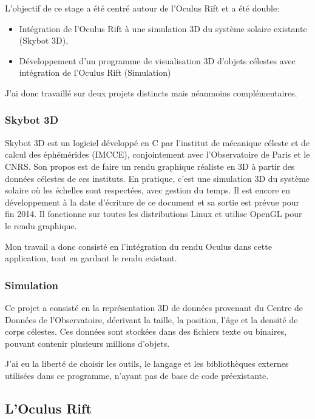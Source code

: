 \documentclass[a4paper,french,12pt]{article}
\begin{document}
		L’objectif de ce stage a été centré autour de l'Oculus Rift et a été double:
		\begin{itemize}
		 \item Intégration de l'Oculus Rift à une simulation 3D du système solaire existante (Skybot 3D),
		 \item Développement d'un programme de visualisation 3D  d'objets célestes avec intégration de l'Oculus Rift (Simulation)
		\end{itemize}
		
		J'ai donc travaillé sur deux projets distincts mais néanmoins complémentaires.
		
	    \subsubsection{Skybot 3D}
		Skybot 3D est un logiciel développé en C par l'institut de mécanique céleste et de calcul des éphémérides (IMCCE),
		conjointement avec l'Observatoire de Paris et le CNRS. Son propos est de faire un rendu graphique réaliste
		en 3D à partir des données célestes de ces instituts. En pratique, c'est une simulation 3D du système solaire
		où les échelles sont respectées, avec gestion du temps. Il est encore en développement à la date d'écriture de ce document et
		sa sortie est prévue pour fin 2014.
		Il fonctionne sur toutes les distributions Linux et utilise OpenGL pour le rendu graphique.
		
		Mon travail a donc consisté en l'intégration du rendu Oculus dans cette application, tout en gardant
		le rendu existant.
		
	    \subsubsection{Simulation}
		Ce projet a consisté en la représentation 3D de données provenant du Centre de Données
		de l'Observatoire, décrivant la taille, la position, l'âge et la densité de corps célestes.
		Ces données sont stockées dans des fichiers texte ou binaires, pouvant contenir plusieurs millions
		d'objets.
		
		J'ai eu la liberté de choisir les outils, le langage et les bibliothèques  externes utilisées dans ce programme,
		n'ayant pas de base de code préexistante.
		
	
	\subsection{L'Oculus Rift}
		
\end{document}
